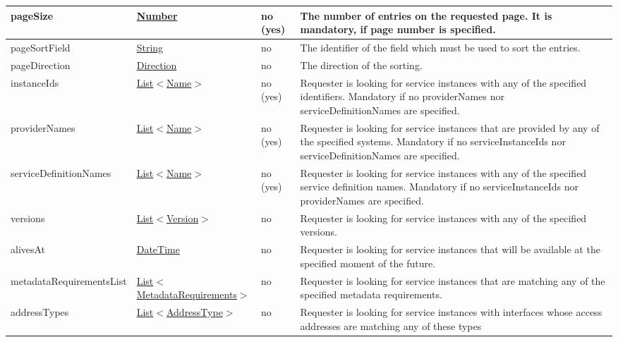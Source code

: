 \documentclass[a4paper]{arrowhead}
\newcommand{\pref}[1]{{\textcolor{ArrowheadGrey}{\hyperref[sec:model:primitives:#1]{#1}}}}
\begin{document}
\begin{table}[ht!]
\begin{tabularx}{\textwidth}{| p{5.6cm} | p{4.9cm} | p{2cm} | X |} \hline
pageSize & \pref{Number} & no (yes) & The number of entries on the requested page. It is mandatory, if page number is specified. \\ \hline
pageSortField & \pref{String} & no & The identifier of the field which must be used to sort the entries. \\ \hline
pageDirection & \pref{Direction} & no & The direction of the sorting. \\ \hline
instanceIds &  \pref{List}$<$\pref{Name}$>$ & no (yes) & Requester is looking for service instances with any of the spe\-cified identifiers. Mandatory if no providerNames nor serviceDefinitionNames are spe\-cified. \\ \hline
providerNames &  \pref{List}$<$\pref{Name}$>$ & no (yes) & Requester is looking for service ins\-tances that are provided by any of the specified systems. Mandatory if no serviceInstanceIds nor serviceDefinitionNames are spe\-cified. \\ \hline
serviceDefinitionNames &  \pref{List}$<$\pref{Name}$>$ & no (yes) & Requester is looking for service ins\-tances with any of the specified service definition names. Mandatory if no serviceInstanceIds nor providerNames are spe\-cified. \\ \hline
versions &  \pref{List}$<$\pref{Version}$>$ & no & Requester is looking for service ins\-tances with any of the specified versions. \\ \hline
alivesAt & \pref{DateTime} & no & Requester is looking for service ins\-tances that will be available at the specified moment of the future. \\ \hline
metadataRequirementsList & \pref{List}$<$\hyperref[sec:model:MetadataRequirements]{MetadataRequirements}$>$ & no & Requester is looking for service ins\-tances that are matching any of the specified metadata requirements.  \\ \hline
addressTypes & \pref{List}$<$\pref{AddressType}$>$ & no & Requester is looking for service ins\-tances with interfaces whose access addresses are matching any of these types \\ \hline
\end{tabularx}
\end{table}

\clearpage
\end{document}
